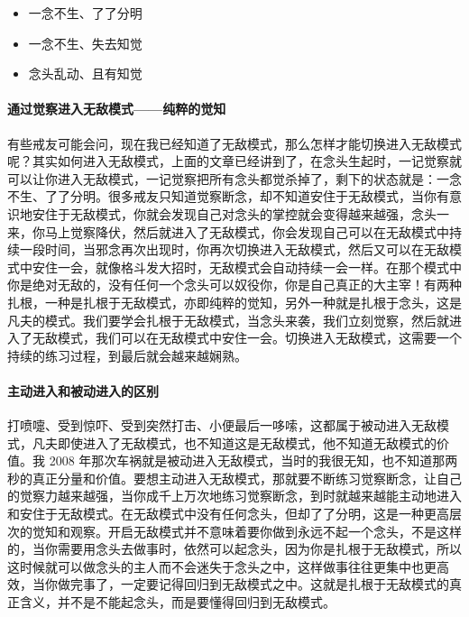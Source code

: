\begin{multicols}{3}
    \begin{itemize}
        \item 一念不生、了了分明
        \item 一念不生、失去知觉
        \item 念头乱动、且有知觉
    \end{itemize}
\end{multicols}

\paragraph{通过觉察进入无敌模式——纯粹的觉知}

有些戒友可能会问，现在我已经知道了无敌模式，那么怎样才能切换进入无敌模式呢？其实如何进入无敌模式，上面的文章已经讲到了，在念头生起时，一记觉察就可以让你进入无敌模式，一记觉察把所有念头都觉杀掉了，剩下的状态就是：一念不生、了了分明。很多戒友只知道觉察断念，却不知道安住于无敌模式，当你有意识地安住于无敌模式，你就会发现自己对念头的掌控就会变得越来越强，念头一来，你马上觉察降伏，然后就进入了无敌模式，你会发现自己可以在无敌模式中持续一段时间，当邪念再次出现时，你再次切换进入无敌模式，然后又可以在无敌模式中安住一会，就像格斗发大招时，无敌模式会自动持续一会一样。在那个模式中你是绝对无敌的，没有任何一个念头可以奴役你，你是自己真正的大主宰！有两种扎根，一种是扎根于无敌模式，亦即纯粹的觉知，另外一种就是扎根于念头，这是凡夫的模式。我们要学会扎根于无敌模式，当念头来袭，我们立刻觉察，然后就进入了无敌模式，我们可以在无敌模式中安住一会。切换进入无敌模式，这需要一个持续的练习过程，到最后就会越来越娴熟。

\paragraph{主动进入和被动进入的区别}

打喷嚏、受到惊吓、受到突然打击、小便最后一哆嗦，这都属于被动进入无敌模式，凡夫即使进入了无敌模式，也不知道这是无敌模式，他不知道无敌模式的价值。我 2008 年那次车祸就是被动进入无敌模式，当时的我很无知，也不知道那两秒的真正分量和价值。要想主动进入无敌模式，那就要不断练习觉察断念，让自己的觉察力越来越强，当你成千上万次地练习觉察断念，到时就越来越能主动地进入和安住于无敌模式。在无敌模式中没有任何念头，但却了了分明，这是一种更高层次的觉知和观察。开启无敌模式并不意味着要你做到永远不起一个念头，不是这样的，当你需要用念头去做事时，依然可以起念头，因为你是扎根于无敌模式，所以这时候就可以做念头的主人而不会迷失于念头之中，这样做事往往更集中也更高效，当你做完事了，一定要记得回归到无敌模式之中。这就是扎根于无敌模式的真正含义，并不是不能起念头，而是要懂得回归到无敌模式。

